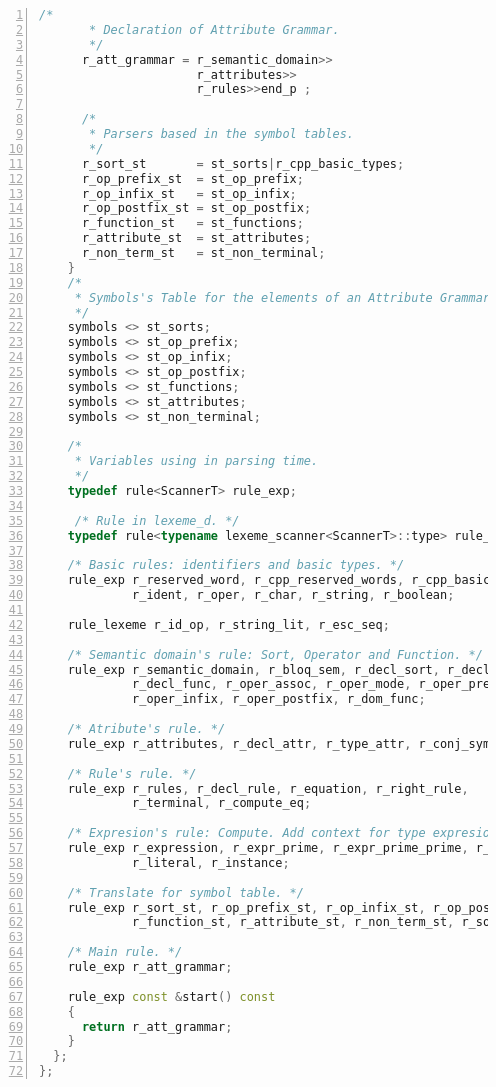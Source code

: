 \begin{lstlisting}[numbers=left,basicstyle=\tiny,language=C++,numberstyle=\tiny, numbersep=5pt]
      /*
       * Declaration of Attribute Grammar.
       */
      r_att_grammar = r_semantic_domain>>
                      r_attributes>>
                      r_rules>>end_p ;

      /*
       * Parsers based in the symbol tables.
       */
      r_sort_st       = st_sorts|r_cpp_basic_types;
      r_op_prefix_st  = st_op_prefix;
      r_op_infix_st   = st_op_infix;
      r_op_postfix_st = st_op_postfix;
      r_function_st   = st_functions;
      r_attribute_st  = st_attributes;
      r_non_term_st   = st_non_terminal;
    }
    /*
     * Symbols's Table for the elements of an Attribute Grammar.
     */
    symbols <> st_sorts;
    symbols <> st_op_prefix;
    symbols <> st_op_infix;
    symbols <> st_op_postfix;
    symbols <> st_functions;
    symbols <> st_attributes;
    symbols <> st_non_terminal;

    /*
     * Variables using in parsing time.
     */
    typedef rule<ScannerT> rule_exp;

     /* Rule in lexeme_d. */
    typedef rule<typename lexeme_scanner<ScannerT>::type> rule_lexeme;

    /* Basic rules: identifiers and basic types. */
    rule_exp r_reserved_word, r_cpp_reserved_words, r_cpp_basic_types,
             r_ident, r_oper, r_char, r_string, r_boolean;

    rule_lexeme r_id_op, r_string_lit, r_esc_seq;

    /* Semantic domain's rule: Sort, Operator and Function. */
    rule_exp r_semantic_domain, r_bloq_sem, r_decl_sort, r_decl_oper,
             r_decl_func, r_oper_assoc, r_oper_mode, r_oper_prefix,
             r_oper_infix, r_oper_postfix, r_dom_func;

    /* Atribute's rule. */
    rule_exp r_attributes, r_decl_attr, r_type_attr, r_conj_symb;

    /* Rule's rule. */
    rule_exp r_rules, r_decl_rule, r_equation, r_right_rule,
             r_terminal, r_compute_eq;

    /* Expresion's rule: Compute. Add context for type expresion. */
    rule_exp r_expression, r_expr_prime, r_expr_prime_prime, r_function,
             r_literal, r_instance;

    /* Translate for symbol table. */
    rule_exp r_sort_st, r_op_prefix_st, r_op_infix_st, r_op_postfix_st,
             r_function_st, r_attribute_st, r_non_term_st, r_sort_stable;

    /* Main rule. */
    rule_exp r_att_grammar;

    rule_exp const &start() const
    {
      return r_att_grammar;
    }
  };
};
\end{lstlisting}

